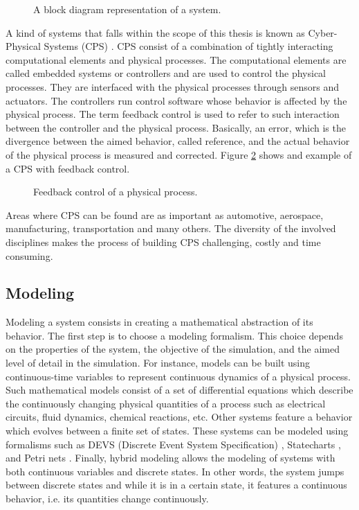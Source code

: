 \begin{figure}[phbt]
\centering

\caption{A block diagram representation of a system.}
\label{fig:system}
\end{figure}

A kind of systems that falls within the scope of this thesis is known as Cyber-Physical Systems (CPS) \cite{lee:2016}. CPS consist of a combination of tightly interacting computational elements and physical processes. The computational elements are called embedded systems or controllers and are used to control the physical processes. They are interfaced with the physical processes through sensors and actuators. The controllers run control software whose behavior is affected by the physical process. The term feedback control is used to refer to such interaction between the controller and the physical process. Basically, an error, which is the divergence between the aimed behavior, called reference, and the actual behavior of the physical process is measured and corrected. Figure \ref{fig:feedb} shows and example of a CPS with feedback control.

\begin{figure}[phbt]
\centering

\caption{Feedback control of a physical process.}
\label{fig:feedb}
\end{figure}  

Areas where CPS can be found are as important as automotive, aerospace, manufacturing, transportation and many others. The diversity of the involved disciplines makes the process of building CPS challenging, costly and time consuming.

\subsection{Modeling}

Modeling a system consists in creating a mathematical abstraction of its behavior. The first step is to choose a modeling formalism. This choice depends on the properties of the system, the objective of the simulation, and the aimed level of detail in the simulation. For instance, models can be built using continuous-time variables to represent continuous dynamics of a physical process. Such mathematical models consist of a set of differential equations which describe the continuously changing physical quantities of a process such as electrical circuits, fluid dynamics, chemical reactions, etc. Other systems feature a behavior which evolves between a finite set of states. These systems can be modeled using formalisms such as DEVS (Discrete Event System Specification) \cite{zeigler:2000}, Statecharts \cite{harel:1987}, and Petri nets \cite{petri:1962}. Finally, hybrid modeling allows the modeling of systems with both continuous variables and discrete states. In other words, the system jumps between discrete states and while it is in a certain state, it features a continuous behavior, i.e. its quantities change continuously. 

